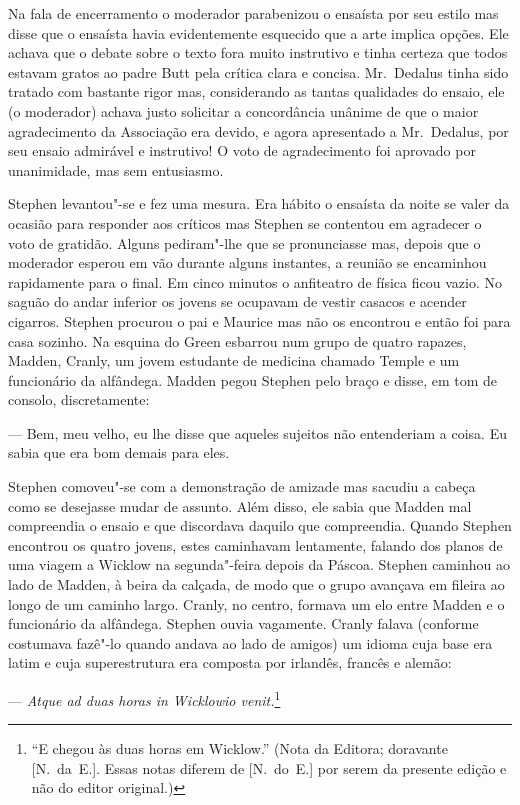 Na fala de encerramento o moderador parabenizou o ensaísta por seu estilo mas
disse que o ensaísta havia evidentemente esquecido que a arte implica opções.
Ele achava que o debate sobre o texto fora muito instrutivo e tinha certeza que
todos estavam gratos ao padre Butt pela crítica clara e concisa.  Mr.~Dedalus
tinha sido tratado com bastante rigor mas, considerando as tantas qualidades do
ensaio, ele (o moderador) achava justo solicitar a concordância unânime de que
o maior agradecimento da Associação era devido, e agora apresentado a 
Mr.~Dedalus, por seu ensaio admirável e instrutivo!  O voto de agradecimento foi
aprovado por unanimidade, mas sem entusiasmo.

Stephen levantou"-se e fez uma mesura.  Era hábito o ensaísta da noite se valer
da ocasião para responder aos críticos mas Stephen se contentou em agradecer o
voto de gratidão.  Alguns pediram"-lhe que se pronunciasse mas, depois que o
moderador esperou em vão durante alguns instantes, a reunião se encaminhou
rapidamente para o final.  Em cinco minutos o anfiteatro de física ficou vazio.
No saguão do andar inferior os jovens se ocupavam de vestir casacos e acender
cigarros.  Stephen procurou o pai e Maurice mas não os encontrou e então foi
para casa sozinho.  Na esquina do Green esbarrou num grupo de quatro rapazes,
Madden, Cranly, um jovem estudante de medicina chamado Temple e um funcionário
da alfândega.  Madden pegou Stephen pelo braço e disse, em tom de consolo,
discretamente:

--- Bem, meu velho, eu lhe disse que aqueles sujeitos não entenderiam a coisa.
Eu sabia que era bom demais para eles.

Stephen comoveu"-se com a demonstração de amizade mas sacudiu a cabeça como se
desejasse mudar de assunto.  Além disso, ele sabia que Madden mal compreendia o
ensaio e que discordava daquilo que compreendia.  Quando Stephen encontrou os
quatro jovens, estes caminhavam lentamente, falando dos planos de uma viagem a
Wicklow na segunda"-feira depois da Páscoa.  Stephen caminhou ao lado de Madden,
à beira da calçada, de modo que o grupo avançava em fileira ao longo de um
caminho largo.  Cranly, no centro, formava um elo entre Madden e o funcionário
da alfândega.  Stephen ouvia vagamente.  Cranly falava (conforme costumava
fazê"-lo quando andava ao lado de amigos) um idioma cuja base era latim e cuja
superestrutura era composta por irlandês, francês e alemão:

--- \textit{Atque ad duas horas in Wicklowio venit.}\footnote{ ``E chegou às duas horas em Wicklow.'' 
(Nota da Editora; doravante [N.~da~E.]. Essas notas diferem de [N.~do~E.] 
por serem da presente edição e não do editor original.)}

